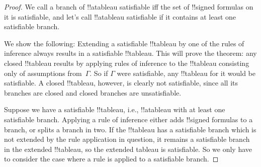 \documentclass[../../../include/open-logic-section]{subfiles}
\begin{document}
\begin{proof}
We call a branch of !!a{tableau} satisfiable iff the set of
!!{signed formula}s on it is satisfiable, and let's call !!a{tableau}
satisfiable if it contains at least one satisfiable branch.

We show the following: Extending a satisfiable !!{tableau} by one of
the rules of inference always results in a satisfiable !!{tableau}.
This will prove the theorem: any closed !!{tableau} results by
applying rules of inference to the !!{tableau} consisting only of
assumptions from~$\Gamma$. So if $\Gamma$ were satisfiable, any
!!{tableau} for it would be satisfiable. A closed !!{tableau},
however, is clearly not satisfiable, since all its branches are closed
and closed branches are unsatisfiable.

Suppose we have a satisfiable !!{tableau}, i.e., !!a{tableau} with at
least one satisfiable branch. Applying a rule of inference either adds
!!{signed formula}s to a branch, or splits a branch in two. If the
!!{tableau} has a satisfiable branch which is not extended by the rule
application in question, it remains a satisfiable branch in the
extended !!{tableau}, so the extended tableau is satisfiable. So we
only have to consider the case where a rule is applied to a
satisfiable branch.


\end{proof}
\end{document}
